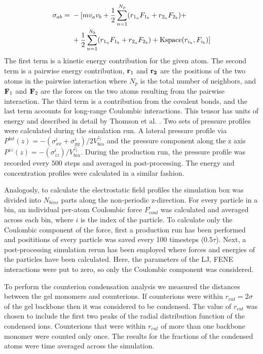\documentclass[twoside,twocolumn,9pt]{article}
\begin{document}
\begin{align}
\begin{split}\label{eq:stress_atom}
    \sigma_{ab} ={}& - [ m v_a v_b +
          \frac{1}{2} \sum_{n = 1}^{N_p} (r_{1_a} F_{1_b} + r_{2_a} F_{2_b}) + \\
         & + \frac{1}{2} \sum_{n = 1}^{N_b} (r_{1_a} F_{1_b} + r_{2_a} F_{2_b}) + 
          {\rm Kspace}(r_{i_a},F_{i_b}) ]
\end{split}
\end{align}
The first term is a kinetic energy contribution for the given atom. The second term is a pairwise energy contribution, ${\bf r}_1$ and $\bf{r}_2$ are the positions of the two atoms in the pairwise interaction where $N_p$ is the total number of neighbors, and ${\bf F}_1$ and ${\bf F}_2$ are the forces on the two atoms resulting from the pairwise interaction. The third term is a contribution from the covalent bonds, and the last term accounts for long-range Coulombic interactions. This tensor has units of energy and described in detail by Thomson et al. \citep{thompson2009general}. Two sets of pressure profiles were calculated during the simulation run. A lateral pressure profile via $P^{lat}(z)=-( \sigma_{xx}^i + \sigma_{yy}^i)/ 2V^{z_j}_{bin}$ and the pressure component along the z axis $P^{zz}(z)=-(\sigma_{zz}^i)/ V^{z_j}_{bin}$. During the production run, the pressure profile was recorded every $500$ steps and averaged in post-processing. The energy and concentration profiles were calculated in a similar fashion.

Analogosly, to calculate the electrostatic field profiles the simulation box was divided into $N_{bins}$ parts along the non-periodic z-direction. For every particle in a bin, an individual per-atom Coulombic force $F^i_{coul}$ was calculated and averaged across each bin, where $i$ is the index of the particle. To calculate only the Coulombic component of the force, first a production run has been performed and posititions of every particle was saved every 100 timesteps ($0.5\tau$). Next, a post-processing simulation rerun has been employed where forces and energies of the particles have been calculated. Here, the parameters of the LJ, FENE  interactions were put to zero, so only the Coulombic component was considered. 

To perform the counterion condensation analysis we measured the distances between the gel monomers and counterions. If counterions were within $r_{cut} = 2 \sigma$ of the gel backbone then it was considered to be condensed. The value of $r_{cut}$ was chosen to include the first two peaks of the radial distribution function of the condensed ions. Counterions that were within $r_{cut}$ of more than one backbone monomer were counted only once. The results for the fractions of the condensed atoms were time averaged across the simulation.
\end{document}
